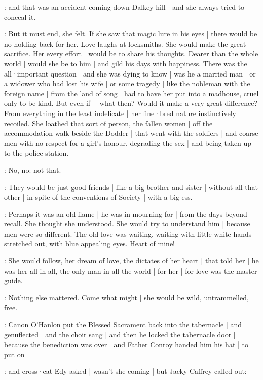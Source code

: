 \gertyReal:
and that was an accident coming down Dalkey hill |
and she always tried to conceal it.

\gertyNovel:
But it must end,
she felt.
If she saw that magic lure in his eyes |
there would be no holding back for her.
Love laughs at locksmiths.
She would make the great sacrifice.
Her every effort |
would be to share his thoughts.
Dearer than the whole world |
would she be to him |
and gild his days with happiness.
There was the all·important question |
and she was dying to know |
was he a married man |
or a widower who had lost his wife |
or some tragedy |
like the nobleman with the foreign name |
from the land of song |
had to have her put into a madhouse,
cruel only to be kind.
But even if—%
what then?
Would it make a very great difference?%
From everything in the least indelicate |
her fine·bred nature instinctively recoiled.
She loathed that sort of person,
the fallen women |
off the accommodation walk beside the Dodder |
that went with the soldiers |
and coarse men
with no respect for a girl's honour,
degrading the sex |
and being taken up to the police station.

\gertyJudgy:
No,
no:
not that.

\gertyReal:
They would be just good friends |
like a big brother and sister |
without all that other |
in spite of the conventions of Society |
with a big ess.

\gertyNovel:
Perhaps it was an old flame |
he was in mourning for |
from the days beyond recall.
She thought she understood.
She would try to understand him |
because men were so different.
The old love was waiting,
waiting with little white hands stretched out,
with blue appealing eyes.%
Heart of mine!

\gertyRomantic:
She would follow,
her dream of love,
the dictates of her heart |
that told her |
he was her all in all,
the only man in all the world |
for her |
for love was the master guide.

\gertySex:
Nothing else mattered.
Come what might |
she would be wild,
untrammelled,
free.

\Nrelig:
Canon O'Hanlon
put the Blessed Sacrament
back into the tabernacle |
and genuflected |
and the choir sang  |
and then he locked the tabernacle door |
because the benediction was over |
and Father Conroy handed him his hat |
to put on

:
and cross·cat Edy asked |
wasn't she coming |
but Jacky Caffrey called out:

